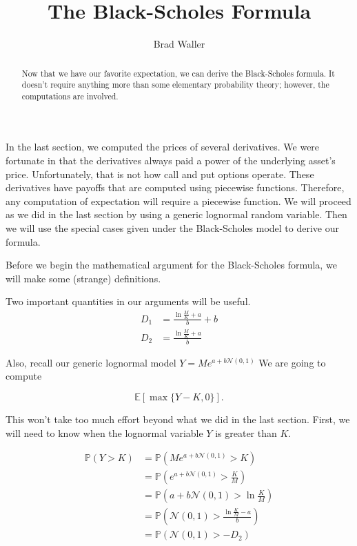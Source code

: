 \documentclass{ximera}
\author{Brad Waller}
\title{The Black-Scholes Formula}
\begin{document}
\begin{abstract}
Now that we have our favorite expectation, we can derive the Black-Scholes formula. It doesn't require anything more than some elementary probability theory; however, the computations are involved.
\end{abstract}

\maketitle

In the last section, we computed the prices of several derivatives. We were fortunate in that the derivatives always paid a power of the underlying asset's price. Unfortunately, that is not how call and put options operate. These derivatives have payoffs that are computed using piecewise functions. Therefore, any computation of expectation will require a piecewise function. We will proceed as we did in the last section by using a generic lognormal random variable. Then we will use the special cases given under the Black-Scholes model to derive our formula. 

Before we begin the mathematical argument for the Black-Scholes formula, we will make some (strange) definitions. 

\begin{definition}
Two important quantities in our arguments will be useful. 
	\begin{align*}
	D_1 	&=\frac{\ln\frac{M}{K}+a}{b}+b\\
	D_2 	&=\frac{\ln\frac{M}{K}+a}{b}
	\end{align*}
\end{definition}

Also, recall our generic lognormal model $Y=Me^{a+b\mathcal{N}(0,1)}$ We are going to compute

\begin{equation*}
\mathbb{E}[\max\{Y-K,0\}].
\end{equation*}

This won't take too much effort beyond what we did in the last section. First, we will need to know when the lognormal variable $Y$ is greater than $K$.

\begin{align*}
\mathbb{P}(Y>K) 	&=\mathbb{P}(Me^{a+b\mathcal{N}(0,1)}>K)\\
			&=\mathbb{P}\left(e^{a+b\mathcal{N}(0,1)}>\frac{K}{M}\right)\\
			&=\mathbb{P}\left(a+b\mathcal{N}(0,1)>\ln\frac{K}{M}\right)\\
			&=\mathbb{P}\left(\mathcal{N}(0,1)>\frac{\ln\frac{K}{M}-a}{b}\right)\\
			&=\mathbb{P}(\mathcal{N}(0,1)>-D_2)
\end{align*}
\end{document}
